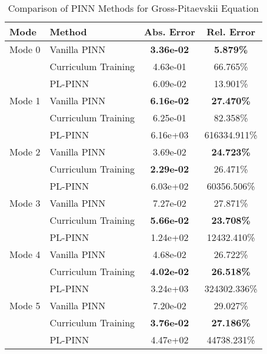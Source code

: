\begin{table}[htbp]
\centering
\caption{Comparison of PINN Methods for Gross-Pitaevskii Equation}
\label{tab:pinn_comparison}
\begin{tabular}{llcc}
\toprule
Mode & Method & Abs. Error & Rel. Error \\
\midrule
Mode 0 & Vanilla PINN & \textbf{3.36e-02} & \textbf{5.879\%} \\
 & Curriculum Training & 4.63e-01 & 66.765\% \\
 & PL-PINN & 6.09e-02 & 13.901\% \\
\midrule
Mode 1 & Vanilla PINN & \textbf{6.16e-02} & \textbf{27.470\%} \\
 & Curriculum Training & 6.25e-01 & 82.358\% \\
 & PL-PINN & 6.16e+03 & 616334.911\% \\
\midrule
Mode 2 & Vanilla PINN & 3.69e-02 & \textbf{24.723\%} \\
 & Curriculum Training & \textbf{2.29e-02} & 26.471\% \\
 & PL-PINN & 6.03e+02 & 60356.506\% \\
\midrule
Mode 3 & Vanilla PINN & 7.27e-02 & 27.871\% \\
 & Curriculum Training & \textbf{5.66e-02} & \textbf{23.708\%} \\
 & PL-PINN & 1.24e+02 & 12432.410\% \\
\midrule
Mode 4 & Vanilla PINN & 4.68e-02 & 26.722\% \\
 & Curriculum Training & \textbf{4.02e-02} & \textbf{26.518\%} \\
 & PL-PINN & 3.24e+03 & 324302.336\% \\
\midrule
Mode 5 & Vanilla PINN & 7.20e-02 & 29.027\% \\
 & Curriculum Training & \textbf{3.76e-02} & \textbf{27.186\%} \\
 & PL-PINN & 4.47e+02 & 44738.231\% \\
\bottomrule
\end{tabular}
\end{table}